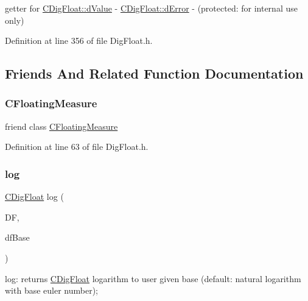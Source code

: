 getter for \hyperlink{classCDigFloat_a4bbe69e30dd4e20527362493aa9aaf96}{C\+Dig\+Float\+::d\+Value} -\/ \hyperlink{classCDigFloat_a25eb3782d1e727ff007a48f8308e3d4d}{C\+Dig\+Float\+::d\+Error} -\/ (protected\+: for internal use only) 



Definition at line 356 of file Dig\+Float.\+h.



\subsection{Friends And Related Function Documentation}
\mbox{\label{classCDigFloat_a7e23751869edf87edc0feeb80eda78d9}} 
\subsubsection{\texorpdfstring{C\+Floating\+Measure}{CFloatingMeasure}}
{\footnotesize\ttfamily friend class \hyperlink{classCFloatingMeasure}{C\+Floating\+Measure}\hspace{0.3cm}{\ttfamily [friend]}}



Definition at line 63 of file Dig\+Float.\+h.

\mbox{\label{classCDigFloat_a25031604af1e6356848a9ac84c209903}} 
\subsubsection{\texorpdfstring{log}{log}}
{\footnotesize\ttfamily \hyperlink{classCDigFloat}{C\+Dig\+Float} log (\begin{DoxyParamCaption}\item[{const \hyperlink{classCDigFloat}{C\+Dig\+Float} \&}]{DF,  }\item[{const \hyperlink{classCDigFloat}{C\+Dig\+Float} \&}]{df\+Base }\end{DoxyParamCaption})\hspace{0.3cm}{\ttfamily [friend]}}



log\+: returns \hyperlink{classCDigFloat}{C\+Dig\+Float} logarithm to user given base (default\+: natural logarithm with base euler number); 



